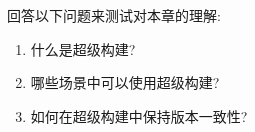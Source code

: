 回答以下问题来测试对本章的理解:

\begin{enumerate}
\item 
什么是超级构建?

\item 
哪些场景中可以使用超级构建?

\item 
如何在超级构建中保持版本一致性?
\end{enumerate}